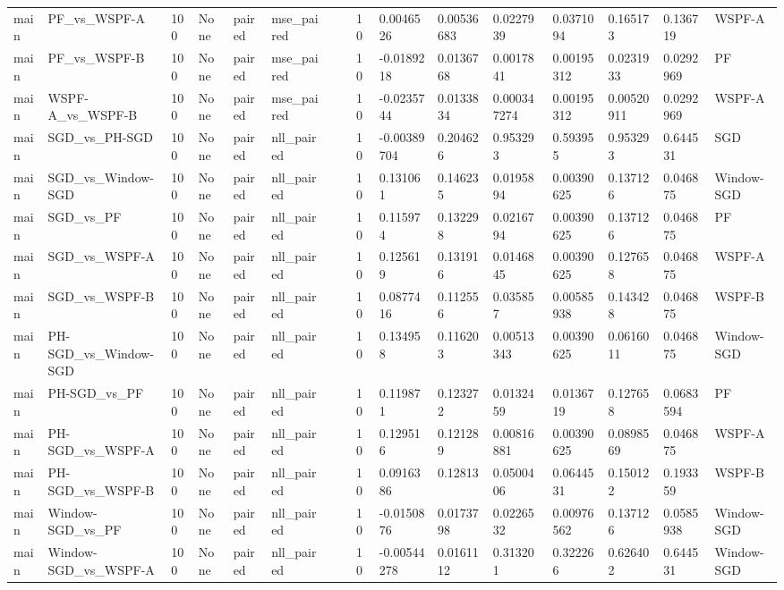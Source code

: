 \begin{tabular}{llllllllllllllll}
main & PF\_vs\_WSPF-A & 100 & None & paired & mse\_paired &  &  & 10 & 0.0046526 & 0.00536683 & 0.0227939 & 0.0371094 & 0.165173 & 0.136719 & WSPF-A \\
main & PF\_vs\_WSPF-B & 100 & None & paired & mse\_paired &  &  & 10 & -0.0189218 & 0.0136768 & 0.0017841 & 0.00195312 & 0.0231933 & 0.0292969 & PF \\
main & WSPF-A\_vs\_WSPF-B & 100 & None & paired & mse\_paired &  &  & 10 & -0.0235744 & 0.0133834 & 0.000347274 & 0.00195312 & 0.00520911 & 0.0292969 & WSPF-A \\
main & SGD\_vs\_PH-SGD & 100 & None & paired & nll\_paired &  &  & 10 & -0.00389704 & 0.204626 & 0.953293 & 0.593955 & 0.953293 & 0.644531 & SGD \\
main & SGD\_vs\_Window-SGD & 100 & None & paired & nll\_paired &  &  & 10 & 0.131061 & 0.146235 & 0.0195894 & 0.00390625 & 0.137126 & 0.046875 & Window-SGD \\
main & SGD\_vs\_PF & 100 & None & paired & nll\_paired &  &  & 10 & 0.115974 & 0.132298 & 0.0216794 & 0.00390625 & 0.137126 & 0.046875 & PF \\
main & SGD\_vs\_WSPF-A & 100 & None & paired & nll\_paired &  &  & 10 & 0.125619 & 0.131916 & 0.0146845 & 0.00390625 & 0.127658 & 0.046875 & WSPF-A \\
main & SGD\_vs\_WSPF-B & 100 & None & paired & nll\_paired &  &  & 10 & 0.0877416 & 0.112556 & 0.035857 & 0.00585938 & 0.143428 & 0.046875 & WSPF-B \\
main & PH-SGD\_vs\_Window-SGD & 100 & None & paired & nll\_paired &  &  & 10 & 0.134958 & 0.116203 & 0.00513343 & 0.00390625 & 0.0616011 & 0.046875 & Window-SGD \\
main & PH-SGD\_vs\_PF & 100 & None & paired & nll\_paired &  &  & 10 & 0.119871 & 0.123272 & 0.0132459 & 0.0136719 & 0.127658 & 0.0683594 & PF \\
main & PH-SGD\_vs\_WSPF-A & 100 & None & paired & nll\_paired &  &  & 10 & 0.129516 & 0.121289 & 0.00816881 & 0.00390625 & 0.0898569 & 0.046875 & WSPF-A \\
main & PH-SGD\_vs\_WSPF-B & 100 & None & paired & nll\_paired &  &  & 10 & 0.0916386 & 0.12813 & 0.0500406 & 0.0644531 & 0.150122 & 0.193359 & WSPF-B \\
main & Window-SGD\_vs\_PF & 100 & None & paired & nll\_paired &  &  & 10 & -0.0150876 & 0.0173798 & 0.0226532 & 0.00976562 & 0.137126 & 0.0585938 & Window-SGD \\
main & Window-SGD\_vs\_WSPF-A & 100 & None & paired & nll\_paired &  &  & 10 & -0.00544278 & 0.0161112 & 0.313201 & 0.322266 & 0.626402 & 0.644531 & Window-SGD \\

\end{tabular}

